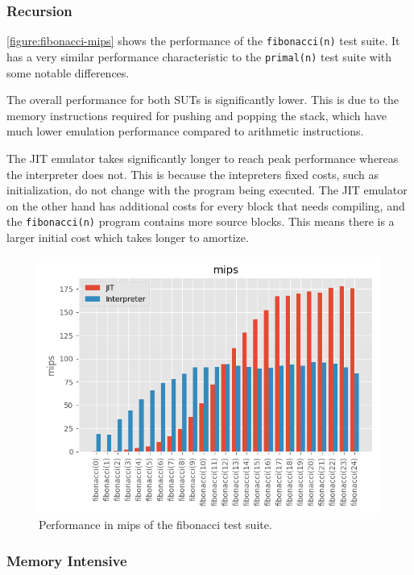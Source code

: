\subsubsection{Recursion}

\autoref{figure:fibonacci-mips} shows the performance of the \texttt{fibonacci(n)} test suite. It has a very similar performance characteristic to the \texttt{primal(n)} test suite with some notable differences.

The overall performance for both SUTs is significantly lower. This is due to the memory instructions required for pushing and popping the stack, which have much lower emulation performance compared to arithmetic instructions.

The JIT emulator takes significantly longer to reach peak performance whereas the interpreter does not. This is because the intepreters fixed costs, such as initialization, do not change with the program being executed. The JIT emulator on the other hand has additional costs for every block that needs compiling, and the \texttt{fibonacci(n)} program contains more source blocks. This means there is a larger initial cost which takes longer to amortize.

\begin{figure}
    \centering
    \includegraphics{output/graphs/tests/fibonacci/mips.png}
    \caption{Performance in mips of the fibonacci test suite.}
    \label{figure:fibonacci-mips}
\end{figure}

\subsubsection{Memory Intensive}

